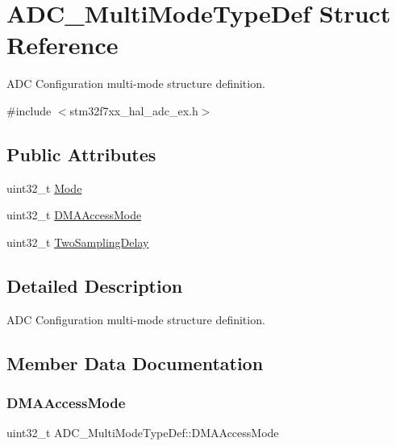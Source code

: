 \hypertarget{struct_a_d_c___multi_mode_type_def}{}\section{A\+D\+C\+\_\+\+Multi\+Mode\+Type\+Def Struct Reference}
\label{struct_a_d_c___multi_mode_type_def}


A\+DC Configuration multi-\/mode structure definition.  




{\ttfamily \#include $<$stm32f7xx\+\_\+hal\+\_\+adc\+\_\+ex.\+h$>$}

\subsection*{Public Attributes}
\begin{DoxyCompactItemize}
\item 
uint32\+\_\+t \mbox{\hyperlink{struct_a_d_c___multi_mode_type_def_a424b5606c9d5dfbfdc850080d34552ff}{Mode}}
\item 
uint32\+\_\+t \mbox{\hyperlink{struct_a_d_c___multi_mode_type_def_a7b7dd802999d735f7179574946acb57d}{D\+M\+A\+Access\+Mode}}
\item 
uint32\+\_\+t \mbox{\hyperlink{struct_a_d_c___multi_mode_type_def_a5590cc138c49a97c6433caa29592cd1b}{Two\+Sampling\+Delay}}
\end{DoxyCompactItemize}


\subsection{Detailed Description}
A\+DC Configuration multi-\/mode structure definition. 



\subsection{Member Data Documentation}
\mbox{\label{struct_a_d_c___multi_mode_type_def_a7b7dd802999d735f7179574946acb57d}} 
\subsubsection{\texorpdfstring{DMAAccessMode}{DMAAccessMode}}
{\footnotesize\ttfamily uint32\+\_\+t A\+D\+C\+\_\+\+Multi\+Mode\+Type\+Def\+::\+D\+M\+A\+Access\+Mode}

